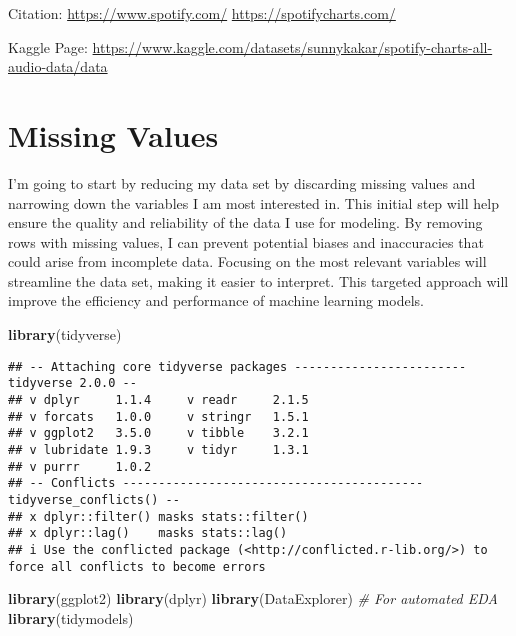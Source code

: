\documentclass[
]{article}
\newenvironment{Shaded}{\begin{snugshade}}{\end{snugshade}}
\newcommand{\CommentTok}[1]{\textcolor[rgb]{0.56,0.35,0.01}{\textit{#1}}}
\newcommand{\FunctionTok}[1]{\textcolor[rgb]{0.13,0.29,0.53}{\textbf{#1}}}
\newcommand{\NormalTok}[1]{#1}
\begin{document}
Citation: \url{https://www.spotify.com/}
\url{https://spotifycharts.com/}

Kaggle Page:
\url{https://www.kaggle.com/datasets/sunnykakar/spotify-charts-all-audio-data/data}

\hypertarget{missing-values}{%
\section{\texorpdfstring{\textbf{Missing
Values}}{Missing Values}}\label{missing-values}}

I'm going to start by reducing my data set by discarding missing values
and narrowing down the variables I am most interested in. This initial
step will help ensure the quality and reliability of the data I use for
modeling. By removing rows with missing values, I can prevent potential
biases and inaccuracies that could arise from incomplete data. Focusing
on the most relevant variables will streamline the data set, making it
easier to interpret. This targeted approach will improve the efficiency
and performance of machine learning models.

\begin{Shaded}
\begin{Highlighting}[]
\FunctionTok{library}\NormalTok{(tidyverse)  }
\end{Highlighting}
\end{Shaded}

\begin{verbatim}
## -- Attaching core tidyverse packages ------------------------ tidyverse 2.0.0 --
## v dplyr     1.1.4     v readr     2.1.5
## v forcats   1.0.0     v stringr   1.5.1
## v ggplot2   3.5.0     v tibble    3.2.1
## v lubridate 1.9.3     v tidyr     1.3.1
## v purrr     1.0.2     
## -- Conflicts ------------------------------------------ tidyverse_conflicts() --
## x dplyr::filter() masks stats::filter()
## x dplyr::lag()    masks stats::lag()
## i Use the conflicted package (<http://conflicted.r-lib.org/>) to force all conflicts to become errors
\end{verbatim}

\begin{Shaded}
\begin{Highlighting}[]
\FunctionTok{library}\NormalTok{(ggplot2)    }
\FunctionTok{library}\NormalTok{(dplyr)      }
\FunctionTok{library}\NormalTok{(DataExplorer) }\CommentTok{\# For automated EDA}
\FunctionTok{library}\NormalTok{(tidymodels)}
\end{Highlighting}
\end{Shaded}
\end{document}
